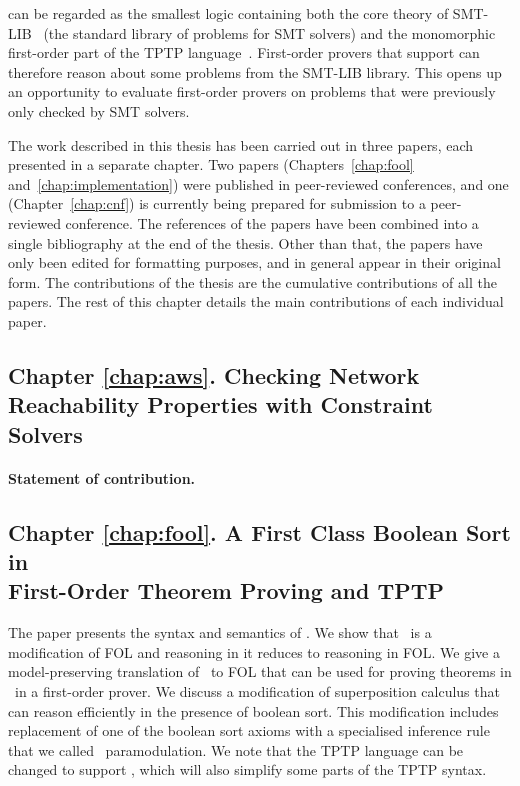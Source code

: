 \folb{} can be regarded as the smallest logic containing both the core theory of SMT-LIB~\cite{SMT-LIB} (the standard library of problems for SMT solvers) and the monomorphic first-order part of the TPTP language~\cite{tff0}. First-order provers that support \folb{} can therefore reason about some problems from the SMT-LIB library. This opens up an opportunity to evaluate first-order provers on problems that were previously only checked by SMT solvers.

The work described in this thesis has been carried out in three papers, each presented in a separate chapter. Two papers (Chapters~\ref{chap:fool} and~\ref{chap:implementation}) were published in peer-reviewed conferences, and one (Chapter~\ref{chap:cnf}) is currently being prepared for submission to a peer-reviewed conference. The references of the papers have been combined into a single bibliography at the end of the thesis. Other than that, the papers have only been edited for formatting purposes, and in general appear in their original form. The contributions of the thesis are the cumulative contributions of all the papers. The rest of this chapter details the main contributions of each individual paper.

\subsection*{Chapter \ref{chap:aws}. Checking Network Reachability Properties with Constraint Solvers}

\paragraph{Statement of contribution.} 


\subsection*{Chapter \ref{chap:fool}. A First Class Boolean Sort in\\First-Order Theorem Proving and TPTP}
The paper presents the syntax and semantics of \folb. We show that \folb\ is a modification of FOL and reasoning in it reduces to reasoning in FOL. We give a model-preserving \iffalse(modulo introduced definitions)\fi translation of \folb\ to FOL that can be used for proving theorems in \folb\ in a first-order prover. We discuss a modification of superposition calculus that can reason efficiently in the presence of boolean sort. This modification includes replacement of one of the boolean sort axioms with a specialised inference rule that we called \folb\ paramodulation. We note that the TPTP language can be changed to support \folb, which will also simplify some parts of the TPTP syntax. 

